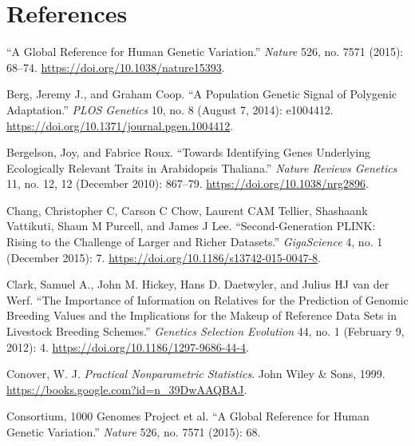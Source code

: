 \documentclass[
  9pt,
]{book}
\newlength{\cslhangindent}
\newlength{\cslentryspacingunit} %
\newenvironment{CSLReferences}[2] %
 {%
  \setlength{\parindent}{0pt}
  \ifodd #1
  \let\oldpar\par
  \def\par{\hangindent=\cslhangindent\oldpar}
  \fi
  \setlength{\parskip}{#2\cslentryspacingunit}
 }%
 {}
\begin{document}
\hypertarget{references}{%
\chapter*{References}\label{references}}

\hypertarget{refs}{}
\begin{CSLReferences}{1}{0}
\leavevmode{}%
{``A Global Reference for Human Genetic Variation.''} \emph{Nature} 526, no. 7571 (2015): 68--74. \url{https://doi.org/10.1038/nature15393}.

\leavevmode{}%
Berg, Jeremy J., and Graham Coop. {``A {Population Genetic Signal} of {Polygenic Adaptation}.''} \emph{PLOS Genetics} 10, no. 8 (August 7, 2014): e1004412. \url{https://doi.org/10.1371/journal.pgen.1004412}.

\leavevmode{}%
Bergelson, Joy, and Fabrice Roux. {``Towards Identifying Genes Underlying Ecologically Relevant Traits in {Arabidopsis} Thaliana.''} \emph{Nature Reviews Genetics} 11, no. 12, 12 (December 2010): 867--79. \url{https://doi.org/10.1038/nrg2896}.

\leavevmode{}%
Chang, Christopher C, Carson C Chow, Laurent CAM Tellier, Shashaank Vattikuti, Shaun M Purcell, and James J Lee. {``Second-Generation {PLINK}: Rising to the Challenge of Larger and Richer Datasets.''} \emph{GigaScience} 4, no. 1 (December 2015): 7. \url{https://doi.org/10.1186/s13742-015-0047-8}.

\leavevmode{}%
Clark, Samuel A., John M. Hickey, Hans D. Daetwyler, and Julius HJ van der Werf. {``The Importance of Information on Relatives for the Prediction of Genomic Breeding Values and the Implications for the Makeup of Reference Data Sets in Livestock Breeding Schemes.''} \emph{Genetics Selection Evolution} 44, no. 1 (February 9, 2012): 4. \url{https://doi.org/10.1186/1297-9686-44-4}.

\leavevmode{}%
Conover, W. J. \emph{Practical {Nonparametric Statistics}}. {John Wiley \& Sons}, 1999. \url{https://books.google.com?id=n_39DwAAQBAJ}.

\leavevmode{}%
Consortium, 1000 Genomes Project et al. {``A Global Reference for Human Genetic Variation.''} \emph{Nature} 526, no. 7571 (2015): 68.


\end{CSLReferences}
\end{document}
